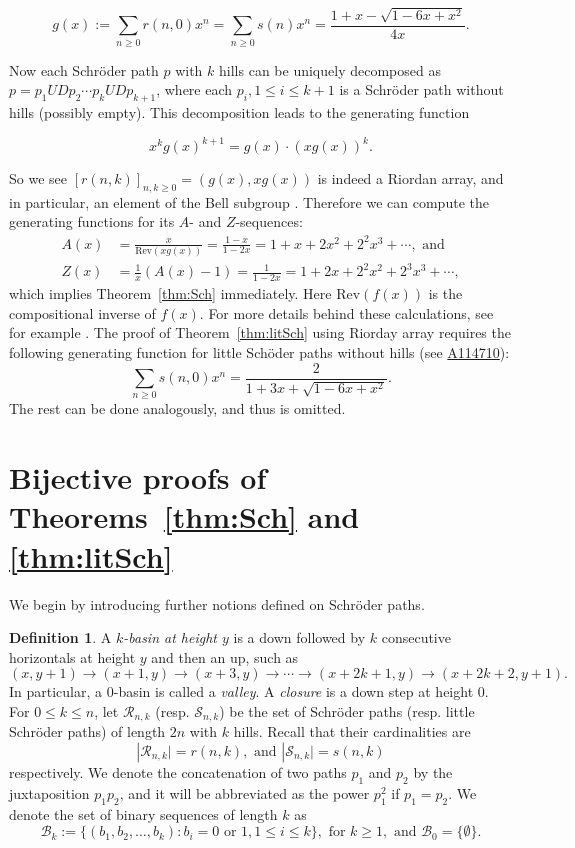 \documentclass[11pt,reqno]{amsart}
\numberwithin{equation}{section}
\theoremstyle{plain}
\theoremstyle{definition}
\newtheorem{Def}[theorem]{Definition}
\newcommand{\R}{\mathcal{R}}
\newcommand{\s}{\mathcal{S}}
\newcommand{\B}{\mathcal{B}}
\newcommand{\Rev}{\mathrm{Rev}}
\begin{document}
$$g(x):=\sum_{n\ge 0}r(n,0)x^n=\sum_{n\ge 0}s(n)x^n=\frac{1+x-\sqrt{1-6x+x^2}}{4x}.$$

Now each Schr\"oder path $p$ with $k$ hills can be uniquely decomposed as $p=p_1UDp_2\cdots p_kUDp_{k+1}$, where each $p_i,1\le i\le k+1$ is a Schr\"oder path without hills (possibly empty). This decomposition leads to the generating function

$$x^kg(x)^{k+1}=g(x)\cdot(xg(x))^k.$$

So we see $[r(n,k)]_{n,k\ge 0}=(g(x),xg(x))$ is indeed a Riordan array, and in particular, an element of the Bell subgroup \cite[\S 2.3]{Sha}. Therefore we can compute the generating functions for its $A$- and $Z$-sequences:
\begin{align*}
A(x)&=\frac{x}{\Rev(xg(x))}=\frac{1-x}{1-2x}=1+x+2x^2+2^2x^3+\cdots, \text{ and}\\
Z(x)&=\frac{1}{x}(A(x)-1)=\frac{1}{1-2x}=1+2x+2^2x^2+2^3x^3+\cdots,
\end{align*}
which implies Theorem~\ref{thm:Sch} immediately. Here $\Rev(f(x))$ is the compositional inverse of $f(x)$. For more details behind these calculations, see for example \cite[\S 7.5]{Bar}. The proof of Theorem~\ref{thm:litSch} using Riorday array requires the following generating function for little Sch\"oder paths without hills (see \href{http://oeis.org/A114710}{A114710}):
$$\sum_{n\ge 0}s(n,0)x^n=\frac{2}{1+3x+\sqrt{1-6x+x^2}}.$$
The rest can be done analogously, and thus is omitted.


\section{Bijective proofs of Theorems~\ref{thm:Sch} and \ref{thm:litSch}}\label{sec:comb pf}

We begin by introducing further notions defined on Schr\"oder paths.
\begin{Def}\label{further notion}
A \emph{$k$-basin at height $y$} is a down followed by $k$ consecutive horizontals at height $y$ and then an up, such as $$(x,y+1)\rightarrow(x+1,y)\rightarrow(x+3,y)\rightarrow \cdots \rightarrow (x+2k+1,y)\rightarrow(x+2k+2,y+1).$$ In particular, a $0$-basin is called a \emph{valley}. A \emph{closure} is a down step at height $0$. For $0\le k\le n$, let $\R_{n,k}$ (resp. $\s_{n,k}$) be the set of Schr\"oder paths (resp. little Schr\"oder paths) of length $2n$ with $k$ hills. Recall that their cardinalities are
$$|\R_{n,k}\vert=r(n,k), \text{ and } |\s_{n,k}\vert=s(n,k)$$
respectively. We denote the concatenation of two paths $p_1$ and $p_2$ by the juxtaposition $p_1p_2$, and it will be abbreviated as the power $p_1^2$ if $p_1=p_2$. We denote the set of binary sequences of length $k$ as
$$
\B_k:=\{(b_1,b_2,\ldots,b_k):\text{$b_i=0$ or $1$}, 1\le i\le k\}, \text{ for } k\ge 1, \text{ and } \B_0=\{\emptyset\}.
$$
\end{Def}
\end{document}
